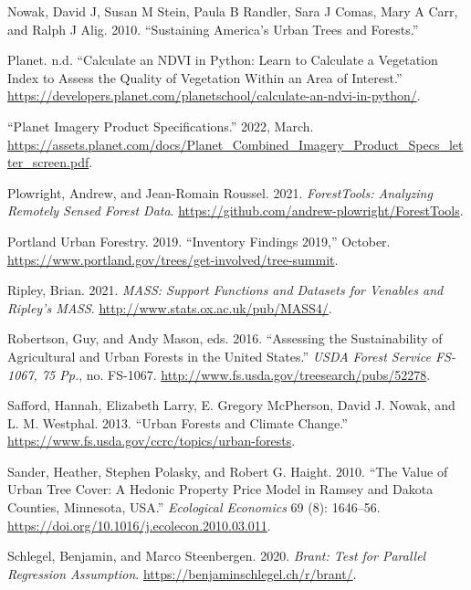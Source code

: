 \documentclass[12pt,twoside]{reedthesis}
\newlength{\cslhangindent}
\newenvironment{CSLReferences}[2] %
 {%
  \setlength{\parindent}{0pt}
  \ifodd #1 \everypar{\setlength{\hangindent}{\cslhangindent}}\ignorespaces\fi
  \ifnum #2 > 0
  \setlength{\parskip}{#2\baselineskip}
  \fi
 }%
 {}
\begin{document}
\begin{CSLReferences}{1}{0}
\leavevmode{}%
Nowak, David J, Susan M Stein, Paula B Randler, Sara J Comas, Mary A Carr, and Ralph J Alig. 2010. {``Sustaining America{'}s Urban Trees and Forests.''}

\leavevmode{}%
Planet. n.d. {``Calculate an NDVI in Python: Learn to Calculate a Vegetation Index to Assess the Quality of Vegetation Within an Area of Interest.''} \url{https://developers.planet.com/planetschool/calculate-an-ndvi-in-python/}.

\leavevmode{}%
{``Planet Imagery Product Specifications.''} 2022, March. \url{https://assets.planet.com/docs/Planet_Combined_Imagery_Product_Specs_letter_screen.pdf}.

\leavevmode{}%
Plowright, Andrew, and Jean-Romain Roussel. 2021. \emph{ForestTools: Analyzing Remotely Sensed Forest Data}. \url{https://github.com/andrew-plowright/ForestTools}.

\leavevmode{}%
Portland Urban Forestry. 2019. {``Inventory Findings 2019,''} October. \url{https://www.portland.gov/trees/get-involved/tree-summit}.

\leavevmode{}%
Ripley, Brian. 2021. \emph{MASS: Support Functions and Datasets for Venables and Ripley's MASS}. \url{http://www.stats.ox.ac.uk/pub/MASS4/}.

\leavevmode{}%
Robertson, Guy, and Andy Mason, eds. 2016. {``Assessing the Sustainability of Agricultural and Urban Forests in the United States.''} \emph{USDA Forest Service FS-1067, 75 Pp.}, no. FS-1067. \url{http://www.fs.usda.gov/treesearch/pubs/52278}.

\leavevmode{}%
Safford, Hannah, Elizabeth Larry, E. Gregory McPherson, David J. Nowak, and L. M. Westphal. 2013. {``Urban Forests and Climate Change.''} \url{https://www.fs.usda.gov/ccrc/topics/urban-forests}.

\leavevmode{}%
Sander, Heather, Stephen Polasky, and Robert G. Haight. 2010. {``The Value of Urban Tree Cover: A Hedonic Property Price Model in Ramsey and Dakota Counties, Minnesota, USA.''} \emph{Ecological Economics} 69 (8): 1646--56. \url{https://doi.org/10.1016/j.ecolecon.2010.03.011}.

\leavevmode{}%
Schlegel, Benjamin, and Marco Steenbergen. 2020. \emph{Brant: Test for Parallel Regression Assumption}. \url{https://benjaminschlegel.ch/r/brant/}.


\end{CSLReferences}
\end{document}
